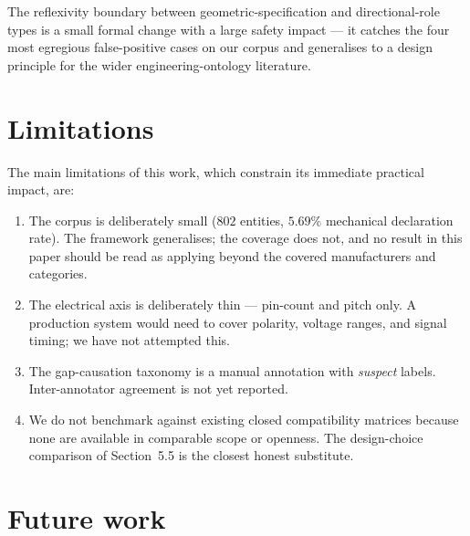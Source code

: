 The reflexivity boundary between geometric-specification and
directional-role types is a small formal change with a large safety
impact — it catches the four most egregious false-positive cases on
our corpus and generalises to a design principle for the wider
engineering-ontology literature.

\section{Limitations}

The main limitations of this work, which constrain its immediate
practical impact, are:

\begin{enumerate}[nosep]
\item The corpus is deliberately small ($802$ entities, $5.69\%$
mechanical declaration rate). The framework generalises; the
coverage does not, and no result in this paper should be read as
applying beyond the covered manufacturers and categories.

\item The electrical axis is deliberately thin — pin-count and
pitch only. A production system would need to cover polarity,
voltage ranges, and signal timing; we have not attempted this.

\item The gap-causation taxonomy is a manual annotation with
\emph{suspect} labels. Inter-annotator agreement is not yet reported.

\item We do not benchmark against existing closed compatibility
matrices because none are available in comparable scope or openness.
The design-choice comparison of Section~5.5 is the closest honest
substitute.
\end{enumerate}

\section{Future work}


